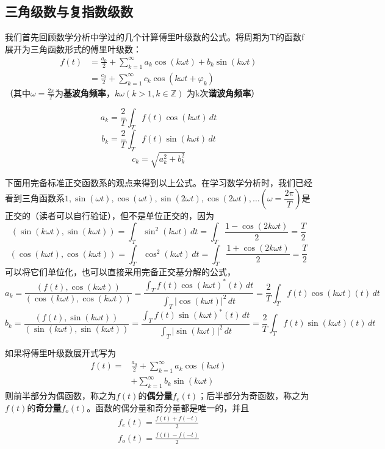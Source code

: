 \documentclass{ctexbook}
\begin{document}
\subsection{三角级数与复指数级数}\label{sub:tri_exp_series}
我们首先回顾数学分析中学过的几个计算傅里叶级数的公式。将周期为T的函数f展开为三角函数形式的傅里叶级数：
\begin{align*}
    f(t) & =\frac{a_0}{2}+\sum_{k = 1}^{\infty} a_k \cos(k\omega t)+b_k\sin(k\omega t) \\
         & =\frac{c_0}{2}+\sum_{k = 1}^{\infty} c_k\cos(k\omega t+\varphi _k)
\end{align*}
（其中$\omega =\frac{2\pi }{T}$为\textbf{基波角频率}，$k\omega (k>1,k\in \mathbb{Z} )$
为k次\textbf{谐波角频率}）
\begin{claim}[三角函数形式的傅里叶系数公式]
\[a_k=\frac{2}{T}\int_T f(t)\cos(k\omega t)\,dt\]
\[b_k=\frac{2}{T}\int_T f(t)\sin(k\omega t)\,dt\]
\[c_k=\sqrt{a_k^2+b_k^2}\]
\end{claim}
下面用完备标准正交函数系的观点来得到以上公式。在学习数学分析时，我们已经看到三角函数系$1,\sin(\omega t),\cos(\omega t),\sin(2\omega t),\cos(2\omega t),\dots\left(\omega =\dfrac{2\pi}{T}\right)$是正交的（读者可以自行验证），但不是单位正交的，因为
\[(\sin(k\omega t),\sin(k\omega t))=\int_{T}\sin^2(k\omega t)\,dt=\int_{T}\frac{1-\cos(2k\omega t)}{2}=\frac{T}{2}\]
\[(\cos(k\omega t),\cos(k\omega t))=\int_{T}\cos^2(k\omega t)\,dt=\int_{T}\frac{1+\cos(2k\omega t)}{2}=\frac{T}{2}\]
可以将它们单位化，也可以直接采用完备正交基分解的公式，
\[a_k=\frac{(f(t),\cos(k\omega t))}{(\cos(k\omega t),\cos(k\omega t))}=\frac{\int_{T}f(t)\cos(k\omega t)^*(t)\,dt}{\int_{T}|\cos(k\omega t)|^2\,dt}
    =\frac{2}{T}\int_{T}f(t)\cos(k\omega t)(t)\,dt\]
\[b_k=\frac{(f(t),\sin(k\omega t))}{(\sin(k\omega t),\sin(k\omega t))}=\frac{\int_{T}f(t)\sin(k\omega t)^*(t)\,dt}{\int_{T}|\sin(k\omega t)|^2\,dt}
    =\frac{2}{T}\int_{T}f(t)\sin(k\omega t)(t)\,dt\]

如果将傅里叶级数展开式写为
\begin{align*}
    f(t) = & \frac{a_0}{2}+\sum_{k = 1}^{\infty} a_k \cos(k\omega t) \\
           & +\sum_{k = 1}^{\infty} b_k \sin(k\omega t)
\end{align*}
则前半部分为偶函数，称之为$f(t)$的\textbf{偶分量}$f_e(t)$；后半部分为奇函数，称之为$f(t)$的\textbf{奇分量}$f_o(t)$。函数的偶分量和奇分量都是唯一的，并且\begin{align*}
    f_e(t)=\frac{f(t)+f(-t)}{2} \\
    f_o(t)=\frac{f(t)-f(-t)}{2}
\end{align*}
\end{document}
